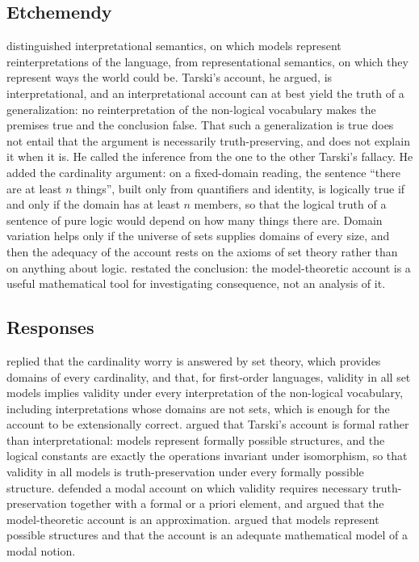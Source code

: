 \documentclass{situationist-preprint}
\begin{document}
\subsection{Etchemendy}

\citet{Etchemendy1990} distinguished interpretational semantics, on which models represent reinterpretations of the language, from representational semantics, on which they represent ways the world could be. Tarski's account, he argued, is interpretational, and an interpretational account can at best yield the truth of a generalization: no reinterpretation of the non-logical vocabulary makes the premises true and the conclusion false. That such a generalization is true does not entail that the argument is necessarily truth-preserving, and does not explain it when it is. He called the inference from the one to the other Tarski's fallacy. He added the cardinality argument: on a fixed-domain reading, the sentence \enquote{there are at least $n$ things}, built only from quantifiers and identity, is logically true if and only if the domain has at least $n$ members, so that the logical truth of a sentence of pure logic would depend on how many things there are. Domain variation helps only if the universe of sets supplies domains of every size, and then the adequacy of the account rests on the axioms of set theory rather than on anything about logic. \citet{Etchemendy2008} restated the conclusion: the model-theoretic account is a useful mathematical tool for investigating consequence, not an analysis of it.

\subsection{Responses}

\citet{McGee1992} replied that the cardinality worry is answered by set theory, which provides domains of every cardinality, and that, for first-order languages, validity in all set models implies validity under every interpretation of the non-logical vocabulary, including interpretations whose domains are not sets, which is enough for the account to be extensionally correct. \citet{Sher1991,Sher1996} argued that Tarski's account is formal rather than interpretational: models represent formally possible structures, and the logical constants are exactly the operations invariant under isomorphism, so that validity in all models is truth-preservation under every formally possible structure. \citet{Hanson1997} defended a modal account on which validity requires necessary truth-preservation together with a formal or a priori element, and argued that the model-theoretic account is an approximation. \citet{Shapiro1998} argued that models represent possible structures and that the account is an adequate mathematical model of a modal notion.
\end{document}

